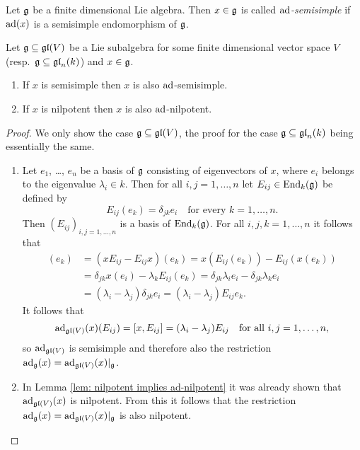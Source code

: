 \begin{defi}
 Let $\mathfrak{g}$ be a finite dimensional Lie algebra. Then $x \in \mathfrak{g}$ is called \emph{$\operatorname{ad}$-semisimple} if $\operatorname{ad}(x)$ is a semisimple endomorphism of $\mathfrak{g}$.
\end{defi}


\begin{lem}\label{lem: ss and nilpotent implies ad-ss and ad-nilpotent}
 Let $\mathfrak{g} \subseteq \mathfrak{gl}(V)$ be a Lie subalgebra for some finite dimensional vector space $V$ (resp.\ $\mathfrak{g} \subseteq \mathfrak{gl}_n(k)$) and $x \in \mathfrak{g}$.
 \begin{enumerate}
  \item
   If $x$ is semisimple then $x$ is also $\operatorname{ad}$-semisimple.
  \item
   If $x$ is nilpotent then $x$ is also $\operatorname{ad}$-nilpotent.
 \end{enumerate}
\end{lem}
\begin{proof}
 We only show the case $\mathfrak{g} \subseteq \mathfrak{gl}(V)$, the proof for the case $\mathfrak{g} \subseteq \mathfrak{gl}_n(k)$ being essentially the same.
 \begin{enumerate}[leftmargin=*]
  \item
   Let $e_1$, \dots, $e_n$ be a basis of $\mathfrak{g}$ consisting of eigenvectors of $x$, where $e_i$ belongs to the eigenvalue $\lambda_i \in k$. Then for all \mbox{$i,j = 1, \dotsc, n$} let $E_{ij} \in \operatorname{End}_k(\mathfrak{g})$ be defined by
   \[
    E_{ij}(e_k) = \delta_{jk} e_i \quad \text{for every $k = 1, \dotsc, n$}.
   \]
   Then $(E_{ij})_{i,j=1,\dotsc,n}$ is a basis of $\operatorname{End}_k(\mathfrak{g})$. For all $i,j,k = 1, \dotsc, n$ it follows that
   \begin{align*}
    [x,E_{ij}](e_k)
    &= (x E_{ij} - E_{ij} x)(e_k)
    = x(E_{ij}(e_k)) - E_{ij}(x(e_k)) \\
    &= \delta_{jk} x(e_i) - \lambda_k E_{ij}(e_k)
    = \delta_{jk} \lambda_i e_i - \delta_{jk} \lambda_k e_i \\
    &= (\lambda_i - \lambda_j) \delta_{jk} e_i
    = (\lambda_i - \lambda_j) E_{ij} e_k.
   \end{align*}
   It follows that
   \[
    \operatorname{ad}_{\mathfrak{gl}(V)}(x)(E_{ij}) = [x,E_{ij}] = (\lambda_i - \lambda_j) E_{ij}
    \quad \text{for all $i,j = 1, \dotsc, n$},
   \]
   so $\operatorname{ad}_{\mathfrak{gl}(V)}$ is semisimple and therefore also the restriction $\operatorname{ad}_{\mathfrak{g}}(x) = \operatorname{ad}_{\mathfrak{gl}(V)}(x)|_{\mathfrak{g}}$.
   
  \item
   In Lemma \ref{lem: nilpotent implies ad-nilpotent} it was already shown that $\operatorname{ad}_{\mathfrak{gl}(V)}(x)$ is nilpotent. From this it follows that the restriction $\operatorname{ad}_{\mathfrak{g}}(x) = \operatorname{ad}_{\mathfrak{gl}(V)}(x)|_{\mathfrak{g}}$ is also nilpotent.
  \qedhere
 \end{enumerate}
\end{proof}


